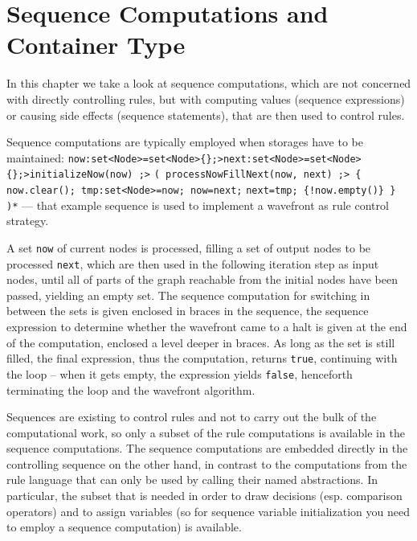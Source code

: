 
\chapter{Sequence Computations and Container Type}\label{seqcomp}

In this chapter we take a look at sequence computations, which are not concerned with directly controlling rules, but with computing values (sequence expressions) or causing side effects (sequence statements), that are then used to control rules.

\begin{example}
Sequence computations are typically employed when storages have to be maintained:
\verb#now:set<Node>=set<Node>{};>next:set<Node>=set<Node>{};>initializeNow(now) ;>#
\verb#( processNowFillNext(now, next) ;> { now.clear(); tmp:set<Node>=now; now=next;#
\verb#next=tmp; {!now.empty()} } )*#
--- that example sequence is used to implement a wavefront as rule control strategy.

A set \texttt{now} of current nodes is processed, filling a set of output nodes to be processed \texttt{next}, which are then used in the following iteration step as input nodes, until all of parts of the graph reachable from the initial nodes have been passed, yielding an empty set.
The sequence computation for switching in between the sets is given enclosed in braces in the sequence, 
the sequence expression to determine whether the wavefront came to a halt is given at the end of the computation,
enclosed a level deeper in braces.
As long as the set is still filled, the final expression, thus the computation, returns \texttt{true}, continuing with the loop -- when it gets empty, the expression yields \texttt{false}, henceforth terminating the loop and the wavefront algorithm.
\end{example}

Sequences are existing to control rules and not to carry out the bulk of the computational work,
so only a subset of the rule computations is available in the sequence computations.
The sequence computations are embedded directly in the controlling sequence on the other hand, in contrast to the computations from the rule language that can only be used by calling their named abstractions.
In particular, the subset that is needed in order to draw decisions (esp. comparison operators) and to assign variables (so for sequence variable initialization you need to employ a sequence computation) is available.

